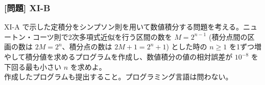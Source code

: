 \documentclass[dvipdfmx,aspectratio=169,20pt]{beamer}
\newcommand{\myfontsetting}[3]{{\fontsize{#1}{#2}\selectfont #3}}
\begin{document}
\begin{frame}
\frametitle{[問題] X\hspace{-.1em}I-B}

\myfontsetting{18pt}{18pt}{
X\hspace{-.1em}I-A で示した定積分をシンプソン則を用いて数値積分する問題を考える。ニュートン・コーツ則で2次多項式近似を行う区間の数を $M=2^{n-1}$ (積分点間の区画の数は $2M=2^n$、積分点の数は $2M+1=2^n+1$) とした時の $n\ge 1$ を1ずつ増やして積分値を求めるプログラムを作成し、数値積分の値の相対誤差が $10^{-8}$ を下回る最も小さい $n$ を求めよ。
}\\
\myfontsetting{12pt}{12pt}{
作成したプログラムも提出すること。プログラミング言語は問わない。
}
\end{frame}
\end{document}
